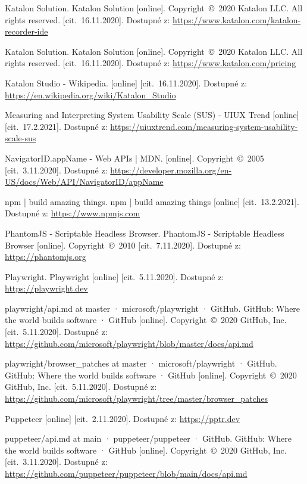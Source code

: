 \begin{thebibliography}{99}
 Katalon Solution. Katalon Solution [online]. Copyright~©~2020 Katalon LLC. All rights reserved. [cit.~16.11.2020]. Dostupné z: \url{https://www.katalon.com/katalon-recorder-ide}

 Katalon Solution. Katalon Solution [online]. Copyright~©~2020 Katalon LLC. All rights reserved. [cit.~16.11.2020]. Dostupné z: \url{https://www.katalon.com/pricing}

 Katalon Studio - Wikipedia. [online] [cit.~16.11.2020]. Dostupné z: \url{https://en.wikipedia.org/wiki/Katalon_Studio}

 Measuring and Interpreting System Usability Scale (SUS) - UIUX Trend [online] [cit.~17.2.2021]. Dostupné z: \url{https://uiuxtrend.com/measuring-system-usability-scale-sus}

 NavigatorID.appName - Web APIs | MDN. [online]. Copyright~©~2005 [cit.~3.11.2020]. Dostupné z: \url{https://developer.mozilla.org/en-US/docs/Web/API/NavigatorID/appName}

 npm | build amazing things. npm | build amazing things [online] [cit.~13.2.2021]. Dostupné z: \url{https://www.npmjs.com}

 PhantomJS - Scriptable Headless Browser. PhantomJS - Scriptable Headless Browser [online]. Copyright~©~2010 [cit.~7.11.2020]. Dostupné z: \url{https://phantomjs.org}

 Playwright. Playwright [online] [cit.~5.11.2020]. Dostupné z: \url{https://playwright.dev}

 playwright/api.md at master · microsoft/playwright · GitHub. GitHub: Where the world builds software · GitHub [online]. Copyright~©~2020 GitHub, Inc. [cit.~5.11.2020]. Dostupné z: \url{https://github.com/microsoft/playwright/blob/master/docs/api.md}

 playwright/browser\_patches at master · microsoft/playwright · GitHub. GitHub: Where the world builds software · GitHub [online]. Copyright~©~2020 GitHub, Inc. [cit.~5.11.2020]. Dostupné z: \url{https://github.com/microsoft/playwright/tree/master/browser_patches}

 Puppeteer [online] [cit.~2.11.2020]. Dostupné z: \url{https://pptr.dev}

 puppeteer/api.md at main · puppeteer/puppeteer · GitHub. GitHub: Where the world builds software · GitHub [online]. Copyright~©~2020 GitHub, Inc. [cit.~3.11.2020]. Dostupné z: \url{https://github.com/puppeteer/puppeteer/blob/main/docs/api.md}


\end{thebibliography}
